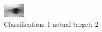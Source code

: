\begin{figure}[h!]
\begin{center}
\includegraphics[width=0.60\columnwidth]{figures/ID471_class_1_target_2.png}
\end{center}
\caption{ Classification: 1 actual target: 2}
\label{fig:ID471_class_1_target_2}
\end{figure}
